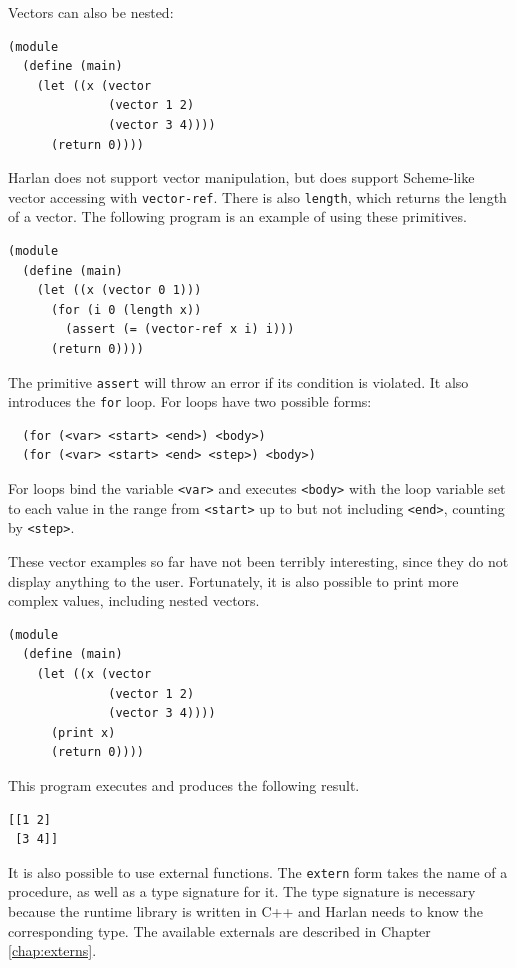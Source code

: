 \documentclass[oneside]{report}
\begin{document}
Vectors can also be nested:

\begin{lstlisting}
(module
  (define (main)
    (let ((x (vector
              (vector 1 2)
              (vector 3 4))))
      (return 0))))
\end{lstlisting}

Harlan does not support vector manipulation, but does support
Scheme-like vector accessing with \lstinline{vector-ref}. There is
also \lstinline{length}, which returns the length of a vector. The
following program is an example of using these primitives.  

\begin{lstlisting}
(module
  (define (main)
    (let ((x (vector 0 1)))
      (for (i 0 (length x))
        (assert (= (vector-ref x i) i)))
      (return 0))))
\end{lstlisting}

The primitive \lstinline{assert} will throw an error if its condition
is violated.  It also introduces the \lstinline{for} loop. For loops
have two possible forms:

\begin{lstlisting}
  (for (<var> <start> <end>) <body>)
  (for (<var> <start> <end> <step>) <body>)
\end{lstlisting}

For loops bind the variable \lstinline{<var>} and executes
\lstinline{<body>} with the loop variable set to each value in the
range from \lstinline{<start>} up to but not including
\lstinline{<end>}, counting by \lstinline{<step>}.

These vector examples so far have not been terribly interesting, since
they do not display anything to the user. Fortunately, it is also
possible to print more complex values, including nested vectors.

\begin{lstlisting}
(module
  (define (main)
    (let ((x (vector
              (vector 1 2)
              (vector 3 4))))
      (print x)
      (return 0))))
\end{lstlisting}

This program executes and produces the following result.

\begin{verbatim}
[[1 2]
 [3 4]]
\end{verbatim}

It is also possible to use external functions.  The \lstinline{extern}
form takes the name of a procedure, as well as a type signature for
it.  The type signature is necessary because the runtime library is
written in C++ and Harlan needs to know the corresponding type.  The
available externals are described in Chapter \ref{chap:externs}.
\end{document}
